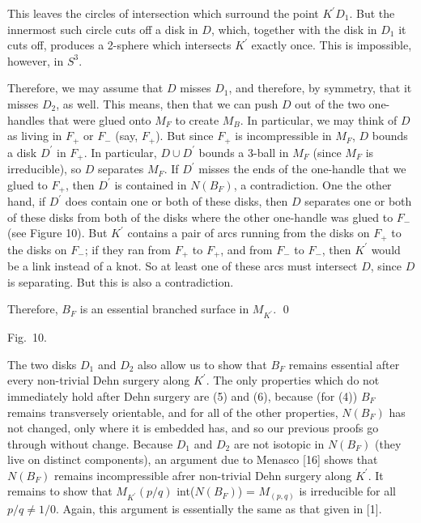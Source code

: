 This leaves the circles of intersection which surround the point 
$K^\prime$\ap$D_1$. But the innermost such circle cuts off a disk in 
$D$, which, together with the disk in $D_1$ it cuts off, produces a 
2-sphere which intersects $K^\prime$ exactly once. This is 
impossible, however, in $S^3$.

Therefore, we may assume that $D$ misses $D_1$, and therefore, by 
symmetry, that it misses $D_2$, as well. This means, then that we can 
push $D$ out of the two one-handles that were glued onto $M_F$ to 
create $M_B$. In particular, we may think of \del$D$ as living in 
$F_+$ or $F_-$ (say, $F_+$). But since $F_+$ is incompressible in 
$M_F$, \del$D$ bounds a disk $D^\prime$ in $F_+$. 
In particular, $D\cup D^\prime$ bounds a 3-ball in $M_F$ (since
$M_F$ is irreducible), so $D$ separates $M_F$. If $D^\prime$ 
misses the ends of the one-handle that we glued to $F_+$, then 
$D^\prime$ is contained in \delh $N(B_F)$, a contradiction. One the 
other hand, if $D^\prime$ does contain one or both of these disks, 
then $D$ separates one or both of these disks from both of the disks 
where the other one-handle was glued to $F_-$ (see Figure 10). But 
$K^\prime$ contains a pair of arcs running from the disks on $F_+$ to 
the disks on $F_-$; if they ran from $F_+$ to $F_+$, and from $F_-$ 
to $F_-$, then $K^\prime$ would be a link instead of a knot. So at 
least one of these arcs must intersect $D$, since $D$ is separating. 
But this is also a contradiction.


Therefore, $B_F$ is an essential branched surface in $M_{K^\prime}$. \qed

\smallskip

\leavevmode

\epsfxsize=2.5in
\centerline{{}}

\centerline{\eightrm Fig.~10.}

\msk



\vglue 12pt
\vglue 5pt

The two disks $D_1$ and $D_2$ also allow us to show that $B_F$ 
remains essential after every non-trivial Dehn surgery along 
$K^\prime$. The only properties which do not 
immediately hold after Dehn surgery are (5) and 
(6), because (for (4)) $B_F$ remains transversely orientable, and for all 
of the other properties, $N(B_F)$ has not changed, 
only where it is embedded has, and so our 
previous proofs go through without change. Because \del$D_1$ and 
\del$D_2$ are not isotopic in \delh $N(B_F)$ (they live on distinct 
components), an argument due to Menasco [16] shows that \delh 
$N(B_F)$ remains incompressible afrer non-trivial Dehn surgery along 
$K^\prime$. It remains to show that $M_{K^\prime}(p/q)$\smin 
int($N(B_F)$) = $M_{(p,q)}$ is irreducible for all $p/q\neq 1/0$. 
Again, this argument is essentially the same as that given in [1].

